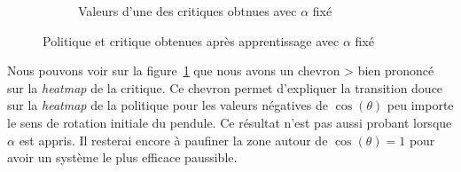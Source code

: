 \begin{figure}[H]
\begin{subfigure}{0.45\textwidth}
        \caption{Valeurs d'une des critiques obtnues avec \(\alpha\) fixé}
    \end{subfigure}
    \caption{Politique et critique obtenues après apprentissage avec \(\alpha\) fixé}\label{fig:sac:heatmap4}
\end{figure}

Nous pouvons voir sur la figure~\ref{fig:sac:heatmap4} que nous avons un chevron > bien prononcé sur la \emph{heatmap} de la critique. Ce chevron permet d'expliquer la transition douce sur la \emph{heatmap} de la politique pour les valeurs négatives de \(\cos(\theta)\) peu importe le sens de rotation initiale du pendule. Ce résultat n'est pas aussi probant lorsque \(\alpha\) est appris. Il resterai encore à paufiner la zone autour de \(\cos(\theta) = 1\) pour avoir un système le plus efficace paussible.